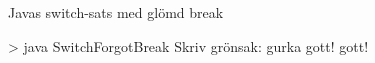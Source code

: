 \begin{Slide}{Javas switch-sats med glömd break}\SlideFontSmall

\vspace{-0.5em}

\vspace{-0.7em}\pause
\begin{REPLsmall}
> java SwitchForgotBreak
Skriv grönsak:
gurka
gott!
gott!
\end{REPLsmall}

\end{Slide}



\ifkompendium  %
\clearpage
\fi

